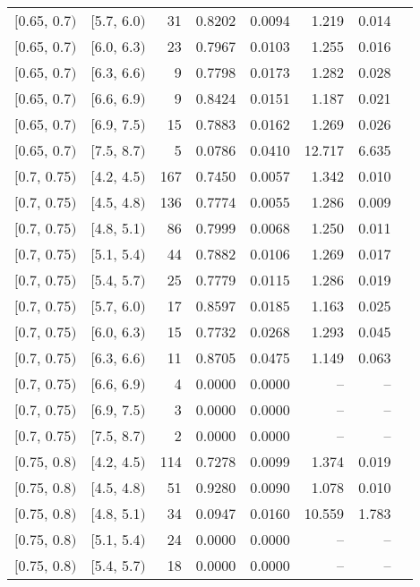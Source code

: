 \begin{longtable}{| l | l | r | r | r | r | r | r |}
        $[$0.65, 0.7$)$ & $[$5.7, 6.0$)$ & 31  & 0.8202 & 0.0094 & 1.219 & 0.014 \\
        $[$0.65, 0.7$)$ & $[$6.0, 6.3$)$ & 23  & 0.7967 & 0.0103 & 1.255 & 0.016 \\
        $[$0.65, 0.7$)$ & $[$6.3, 6.6$)$ & 9   & 0.7798 & 0.0173 & 1.282 & 0.028 \\
        $[$0.65, 0.7$)$ & $[$6.6, 6.9$)$ & 9   & 0.8424 & 0.0151 & 1.187 & 0.021 \\
        $[$0.65, 0.7$)$ & $[$6.9, 7.5$)$ & 15  & 0.7883 & 0.0162 & 1.269 & 0.026 \\
        $[$0.65, 0.7$)$ & $[$7.5, 8.7$)$ & 5   & 0.0786 & 0.0410 & 12.717 & 6.635 \\
        $[$0.7, 0.75$)$ & $[$4.2, 4.5$)$ & 167 & 0.7450 & 0.0057 & 1.342 & 0.010 \\
        $[$0.7, 0.75$)$ & $[$4.5, 4.8$)$ & 136 & 0.7774 & 0.0055 & 1.286 & 0.009 \\
        $[$0.7, 0.75$)$ & $[$4.8, 5.1$)$ & 86  & 0.7999 & 0.0068 & 1.250 & 0.011 \\
        $[$0.7, 0.75$)$ & $[$5.1, 5.4$)$ & 44  & 0.7882 & 0.0106 & 1.269 & 0.017 \\
        $[$0.7, 0.75$)$ & $[$5.4, 5.7$)$ & 25  & 0.7779 & 0.0115 & 1.286 & 0.019 \\
        $[$0.7, 0.75$)$ & $[$5.7, 6.0$)$ & 17  & 0.8597 & 0.0185 & 1.163 & 0.025 \\
        $[$0.7, 0.75$)$ & $[$6.0, 6.3$)$ & 15  & 0.7732 & 0.0268 & 1.293 & 0.045 \\
        $[$0.7, 0.75$)$ & $[$6.3, 6.6$)$ & 11  & 0.8705 & 0.0475 & 1.149 & 0.063 \\
        $[$0.7, 0.75$)$ & $[$6.6, 6.9$)$ & 4   & 0.0000 & 0.0000 & -- & -- \\
        $[$0.7, 0.75$)$ & $[$6.9, 7.5$)$ & 3   & 0.0000 & 0.0000 & -- & -- \\
        $[$0.7, 0.75$)$ & $[$7.5, 8.7$)$ & 2   & 0.0000 & 0.0000 & -- & -- \\
        $[$0.75, 0.8$)$ & $[$4.2, 4.5$)$ & 114 & 0.7278 & 0.0099 & 1.374 & 0.019 \\
        $[$0.75, 0.8$)$ & $[$4.5, 4.8$)$ & 51  & 0.9280 & 0.0090 & 1.078 & 0.010 \\
        $[$0.75, 0.8$)$ & $[$4.8, 5.1$)$ & 34  & 0.0947 & 0.0160 & 10.559 & 1.783 \\
        $[$0.75, 0.8$)$ & $[$5.1, 5.4$)$ & 24  & 0.0000 & 0.0000 & -- & -- \\
        $[$0.75, 0.8$)$ & $[$5.4, 5.7$)$ & 18  & 0.0000 & 0.0000 & -- & -- \\

\end{longtable}
